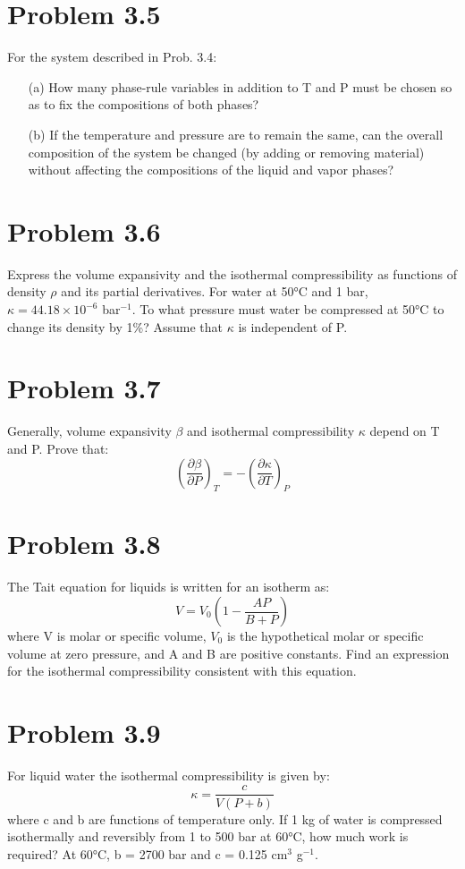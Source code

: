 \documentclass{article}
\begin{document}
\section*{Problem 3.5}
For the system described in Prob. 3.4:
\begin{enumerate}
    \item[(a)] How many phase-rule variables in addition to T and P must be chosen so as to fix the compositions of both phases?
    \item[(b)] If the temperature and pressure are to remain the same, can the overall composition of the system be changed (by adding or removing material) without affecting the compositions of the liquid and vapor phases?
\end{enumerate}

\section*{Problem 3.6}
Express the volume expansivity and the isothermal compressibility as functions of density $\rho$ and its partial derivatives. For water at 50°C and 1 bar, $\kappa = 44.18 \times 10^{-6}$ bar$^{-1}$. To what pressure must water be compressed at 50°C to change its density by 1\%? Assume that $\kappa$ is independent of P.

\section*{Problem 3.7}
Generally, volume expansivity $\beta$ and isothermal compressibility $\kappa$ depend on T and P. Prove that:
$$ \left(\frac{\partial \beta}{\partial P}\right)_T = -\left(\frac{\partial \kappa}{\partial T}\right)_P $$

\section*{Problem 3.8}
The Tait equation for liquids is written for an isotherm as:
$$ V = V_0\left(1 - \frac{AP}{B+P}\right) $$
where V is molar or specific volume, $V_0$ is the hypothetical molar or specific volume at zero pressure, and A and B are positive constants. Find an expression for the isothermal compressibility consistent with this equation.

\section*{Problem 3.9}
For liquid water the isothermal compressibility is given by:
$$ \kappa = \frac{c}{V(P+b)} $$
where c and b are functions of temperature only. If 1 kg of water is compressed isothermally and reversibly from 1 to 500 bar at 60°C, how much work is required? At 60°C, b = 2700 bar and c = 0.125 cm$^3$ g$^{-1}$.
\end{document}
